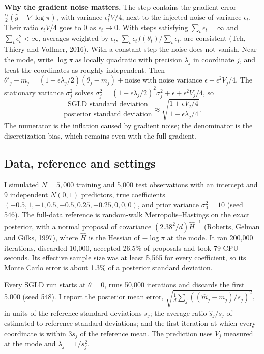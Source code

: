 \documentclass[11pt]{article}
\begin{document}
\textbf{Why the gradient noise matters.} The step contains the gradient error
$\frac{\epsilon_t}{2}(\hat g-\nabla\log\pi)$, with variance $\epsilon_t^2V/4$, next to the injected noise of
variance $\epsilon_t$. Their ratio $\epsilon_tV/4$ goes to 0 as $\epsilon_t\to0$. With steps satisfying
$\sum_t\epsilon_t=\infty$ and $\sum_t\epsilon_t^2<\infty$, averages weighted by $\epsilon_t$,
$\sum_t\epsilon_tf(\theta_t)/\sum_t\epsilon_t$, are consistent (Teh, Thiery and Vollmer, 2016). With a
constant step the noise does not vanish. Near the mode, write $\log\pi$ as locally quadratic with precision
$\lambda_j$ in coordinate $j$, and treat the coordinates as roughly independent. Then
$\theta'_j-m_j=(1-\epsilon\lambda_j/2)(\theta_j-m_j)+\text{noise}$ with noise variance
$\epsilon+\epsilon^2V_j/4$. The stationary variance $\sigma_j^2$ solves
$\sigma_j^2=(1-\epsilon\lambda_j/2)^2\sigma_j^2+\epsilon+\epsilon^2V_j/4$, so
\[
\frac{\text{SGLD standard deviation}}{\text{posterior standard deviation}}
\approx\sqrt{\frac{1+\epsilon V_j/4}{1-\epsilon\lambda_j/4}} .
\]
The numerator is the inflation caused by gradient noise; the denominator is the discretization bias, which
remains even with the full gradient.

\subsection*{Data, reference and settings}

I simulated $N=5{,}000$ training and 5,000 test observations with an intercept and 9 independent $N(0,1)$
predictors, true coefficients $(-0.5,1,-1,0.5,-0.5,0.25,-0.25,0,0,0)$, and prior variance $\sigma_0^2=10$ (seed
546). The full-data reference is random-walk Metropolis--Hastings on the exact posterior, with a normal
proposal of covariance $(2.38^2/d)\hat H^{-1}$ (Roberts, Gelman and Gilks, 1997), where $\hat H$ is the
Hessian of $-\log\pi$ at the mode. It ran 200,000 iterations, discarded 10,000, accepted 26.5\% of proposals and
took 79 CPU seconds. Its effective sample size was at least 5,565 for every coefficient, so its Monte Carlo
error is about 1.3\% of a posterior standard deviation.

Every SGLD run starts at $\theta=0$, runs 50,000 iterations and discards the first 5,000 (seed 548). I
report the posterior mean error,
$\sqrt{\frac1d\sum_j\left((\hat m_j-m_j)/s_j\right)^2}$, in units of the reference standard deviations $s_j$;
the average ratio $\hat s_j/s_j$ of estimated to reference standard deviations; and the first iteration at
which every coordinate is within $3s_j$ of the reference mean. The prediction uses $V_j$ measured at the mode
and $\lambda_j=1/s_j^2$.
\end{document}
